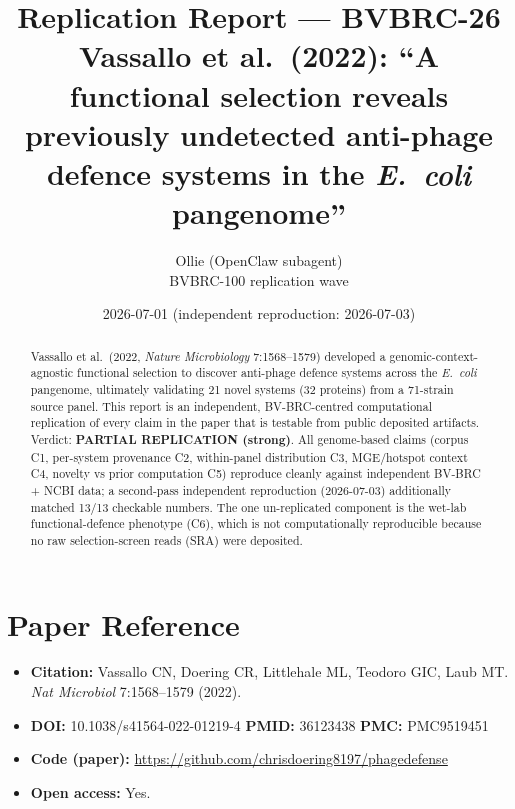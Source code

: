 \documentclass[11pt,letterpaper]{article}
\title{Replication Report --- BVBRC-26\\
\large Vassallo et al.\ (2022): ``A functional selection reveals previously undetected anti-phage defence systems in the \textit{E.\ coli} pangenome''}
\author{Ollie (OpenClaw subagent) \\ BVBRC-100 replication wave}
\date{2026-07-01 (independent reproduction: 2026-07-03)}
\begin{document}
\maketitle

\begin{abstract}
Vassallo et al.\ (2022, \textit{Nature Microbiology} 7:1568--1579) developed a genomic-context-agnostic functional selection to discover anti-phage defence systems across the \textit{E.\ coli} pangenome, ultimately validating 21 novel systems (32 proteins) from a 71-strain source panel. This report is an independent, BV-BRC-centred computational replication of every claim in the paper that is testable from public deposited artifacts. Verdict: \textbf{PARTIAL REPLICATION (strong)}. All genome-based claims (corpus C1, per-system provenance C2, within-panel distribution C3, MGE/hotspot context C4, novelty vs prior computation C5) reproduce cleanly against independent BV-BRC + NCBI data; a second-pass independent reproduction (2026-07-03) additionally matched 13/13 checkable numbers. The one un-replicated component is the wet-lab functional-defence phenotype (C6), which is not computationally reproducible because no raw selection-screen reads (SRA) were deposited.
\end{abstract}

\section{Paper Reference}
\begin{itemize}
    \item \textbf{Citation:} Vassallo CN, Doering CR, Littlehale ML, Teodoro GIC, Laub MT. \textit{Nat Microbiol} 7:1568--1579 (2022).
    \item \textbf{DOI:} 10.1038/s41564-022-01219-4 \quad \textbf{PMID:} 36123438 \quad \textbf{PMC:} PMC9519451
    \item \textbf{Code (paper):} \url{https://github.com/chrisdoering8197/phagedefense}
    \item \textbf{Open access:} Yes.
\end{itemize}
\end{document}
